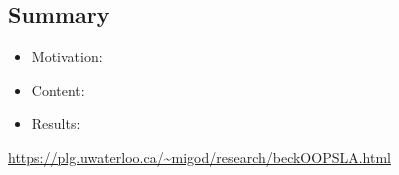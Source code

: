 \begin{otherlanguage}{ngerman}
	\chapter*{Summary}
	
	\begin{itemize}
	  \item Motivation: 
          \item Content:
          \item Results:
	\end{itemize}
	\medskip

	\noindent
	
	\begin{center}
                \url{https://plg.uwaterloo.ca/~migod/research/beckOOPSLA.html}
        \end{center}

\end{otherlanguage}

